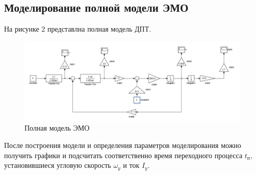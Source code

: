 \documentclass[a4paper, 12pt]{article}
\begin{document}
\newpage
\begin{center}
\section{Моделирование полной модели ЭМО}
\end{center}
\par На рисунке 2 представлна полная модель ДПТ.
\begin{figure}[h!]
    \centering
    \includegraphics[width = \textwidth]{images/FullModel/1.png}
    \caption{Полная модель ЭМО}
\end{figure}

После построения модели и определения параметров моделирования можно получить графики и подсчитать соответственно время переходного процесса $t_\text{п}$, установившиеся угловую скорость $\omega_y$ и ток $I_y$.
\end{document}
